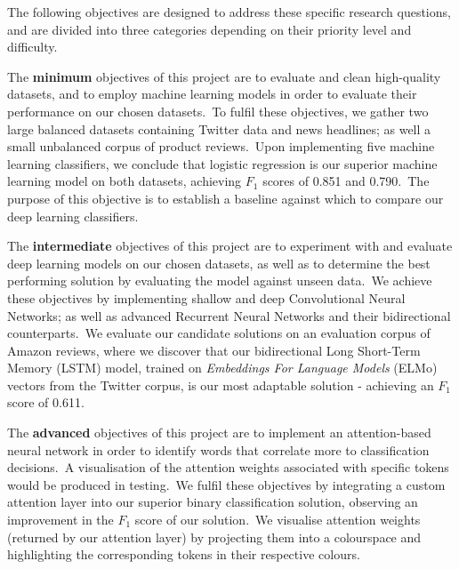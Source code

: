 \documentclass[12pt,a4paper]{article}
\begin{document}
\noindent The following objectives are designed to address these specific research questions, and are divided into three categories depending on their priority level and difficulty. 

The \textbf{minimum} objectives of this project are to evaluate and clean high-quality datasets, and to employ machine learning models in order to evaluate their performance on our chosen datasets.\ To fulfil these objectives, we gather two large balanced datasets containing Twitter data and news headlines; as well a small unbalanced corpus of product reviews.\ Upon implementing five machine learning classifiers, we conclude that logistic regression is our superior machine learning model on both datasets, achieving  $F_{1}$ scores of 0.851 and 0.790.\ The purpose of this objective is to establish a baseline against which to compare our deep learning classifiers.

The \textbf{intermediate} objectives of this project are to experiment with and evaluate deep learning models on our chosen datasets, as well as to determine the best performing solution by evaluating the model against unseen data.\ We achieve these objectives by implementing shallow and deep Convolutional Neural Networks; as well as advanced Recurrent Neural Networks and their bidirectional counterparts.\ We evaluate our candidate solutions on an evaluation corpus of Amazon reviews, where we discover that our bidirectional Long Short-Term Memory (LSTM) model, trained on \textit{Embeddings For Language Models} (ELMo) vectors from the Twitter corpus, is our most adaptable solution - achieving an $F_1$ score of 0.611.
 
The \textbf{advanced} objectives of this project are to implement an attention-based neural network in order to identify words that correlate more to classification decisions.\ A visualisation of the attention weights associated with specific tokens would be produced in testing.\ We fulfil these objectives by integrating a custom attention layer into our superior binary classification solution, observing an improvement in the $F_1$ score of our solution.\ We visualise attention weights (returned by our attention layer) by projecting them into a colourspace and highlighting the corresponding tokens in their respective colours.

\end{document}
